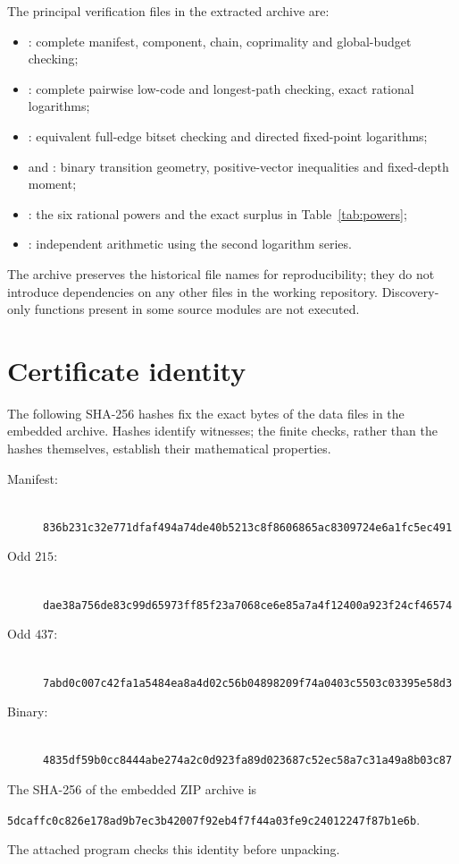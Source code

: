 \documentclass[11pt]{article}
\theoremstyle{definition}
\theoremstyle{remark}
\begin{document}
The principal verification files in the extracted archive are:
\begin{itemize}\small\raggedright
\item {}: complete manifest,
component, chain, coprimality and global-budget checking;
\item {}: complete pairwise
low-code and longest-path checking, exact rational logarithms;
\item {}: equivalent full-edge
bitset checking and directed fixed-point logarithms;
\item {} and
: binary transition geometry,
positive-vector inequalities and fixed-depth moment;
\item {}: the six
rational powers and the exact surplus in Table~\ref{tab:powers};
\item {}: independent
arithmetic using the second logarithm series.
\end{itemize}
The archive preserves the historical file names for reproducibility; they
do not introduce dependencies on any other files in the working repository.
Discovery-only functions present in some source modules are not executed.

\section{Certificate identity}\label{app:hashes}
The following SHA-256 hashes fix the exact bytes of the data files in the
embedded archive. Hashes identify witnesses; the finite checks, rather
than the hashes themselves, establish their mathematical properties.
\begin{description}
\item[Manifest:] \\
\nolinkurl{836b231c32e771dfaf494a74de40b5213c8f8606865ac8309724e6a1fc5ec491}
\item[Odd $215$:] \\
\nolinkurl{dae38a756de83c99d65973ff85f23a7068ce6e85a7a4f12400a923f24cf46574}
\item[Odd $437$:] \\
\nolinkurl{7abd0c007c42fa1a5484ea8a4d02c56b04898209f74a0403c5503c03395e58d3}
\item[Binary:] \\
\nolinkurl{4835df59b0cc8444abe274a2c0d923fa89d023687c52ec58a7c31a49a8b03c87}
\end{description}
The SHA-256 of the embedded ZIP archive is
\begin{center}\small
\nolinkurl{5dcaffc0c826e178ad9b7ec3b42007f92eb4f7f44a03fe9c24012247f87b1e6b}.
\end{center}
The attached program checks this identity before unpacking.
\end{document}
